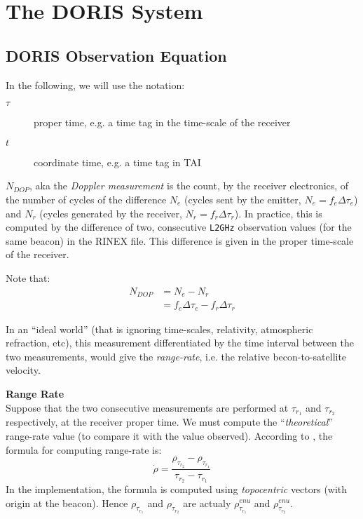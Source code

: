 \chapter{The DORIS System}
\label{ch:doris-system}

\section{DORIS Observation Equation}
\label{sec:doppler-effect}

In the following, we will use the notation:
\begin{description}
  \item[$\tau$] proper time, e.g. a time tag in the time-scale of the receiver
  \item[$t$] coordinate time, e.g. a time tag in TAI
\end{description}

$N_{DOP}$, aka the \emph{Doppler measurement} is the count, by the receiver 
electronics, of the number of cycles of the difference $N_e$ (cycles sent by the 
emitter, $N_e=f_e \Delta \tau_e$) and $N_r$ (cycles generated by the receiver, 
$N_r=f_r \Delta \tau_r$). In practice, this is computed by the difference of two, 
consecutive \texttt{L2GHz} observation values (for the same beacon) in the RINEX file.
This difference is given in the proper time-scale of the receiver.

Note that:
\begin{equation}
  \begin{split}
    N_{DOP} & = N_e - N_r\\
            & = f_e \Delta\tau_e - f_r \Delta\tau_r
  \end{split}
\end{equation}

In an ``ideal world'' (that is ignoring time-scales, relativity, atmospheric 
refraction, etc), this measurement differentiated by the time interval between the 
two measurements, would give the \emph{range-rate}, i.e. the relative becon-to-satellite 
velocity.

\textbf{Range Rate}\\
\label{range-rate}
Suppose that the two consecutive measurements are performed at $\tau_{r_1}$ 
and $\tau_{r_2}$ respectively, at the receiver proper time. We must compute the 
``\emph{theoretical}'' range-rate value (to compare it with the value observed).
According to \cite{Montenbruck2000}, the formula for computing range-rate is:
\begin{equation}
  \dot{\rho} = \frac{\rho_{\tau_{r_2}} - \rho_{\tau_{r_1}}}{\tau_{r_2} - \tau_{r_1}}
\end{equation}
In the implementation, the formula is computed using \emph{topocentric} vectors 
(with origin at the beacon). Hence $\rho_{\tau_{r_1}}$ and $\rho_{\tau_{r_2}}$ are 
actualy $\rho_{\tau_{r_1}}^{enu}$ and $\rho_{\tau_{r_2}}^{enu}$.

